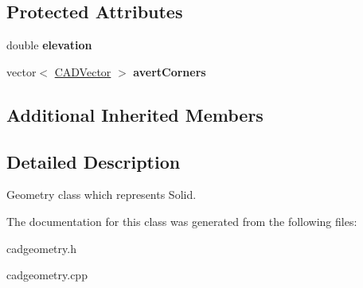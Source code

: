 \subsection*{Protected Attributes}
\begin{DoxyCompactItemize}
\item 
double {\bfseries elevation}\hypertarget{class_c_a_d_solid_a9179228aec091728b6aa964ce02de038}{}\label{class_c_a_d_solid_a9179228aec091728b6aa964ce02de038}

\item 
vector$<$ \hyperlink{class_c_a_d_vector}{C\+A\+D\+Vector} $>$ {\bfseries avert\+Corners}\hypertarget{class_c_a_d_solid_acf02bca8ebc0a2f98be0ba2eb5f61340}{}\label{class_c_a_d_solid_acf02bca8ebc0a2f98be0ba2eb5f61340}

\end{DoxyCompactItemize}
\subsection*{Additional Inherited Members}


\subsection{Detailed Description}
Geometry class which represents Solid. 

The documentation for this class was generated from the following files\+:\begin{DoxyCompactItemize}
\item 
cadgeometry.\+h\item 
cadgeometry.\+cpp\end{DoxyCompactItemize}
